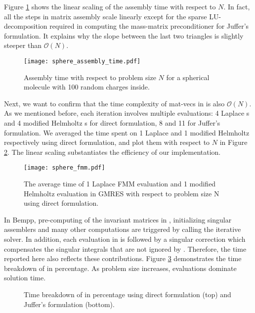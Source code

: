 Figure \ref{fig:sphere_assembly_time} shows the linear scaling of the assembly time with respect to $N$.
In fact, all the steps in matrix assembly scale linearly except for the sparse LU-decomposition required in computing the mass-matrix preconditioner for Juffer's formulation.
It explains why the slope between the last two triangles is slightly steeper than $\mathcal{O}(N)$.

\begin{figure}[htbp]
    \centering
    \texttt{[image: sphere\_assembly\_time.pdf]} 
    \caption{Assembly time with respect to problem size $N$ for a spherical molecule with 100 random charges inside.}
    \label{fig:sphere_assembly_time}
\end{figure}

Next, we want to confirm that the time complexity of mat-vecs in \gmres is also $\mathcal{O}(N)$.
As we mentioned before, each iteration involves multiple \fmm evaluations: 4 Laplace {\fmm}s and 4 modified Helmholtz {\fmm}s for direct formulation, 8 and 11 for Juffer's formulation.
We averaged the time spent on 1 Laplace \fmm and 1 modified Helmholtz \fmm respectively using direct formulation, and plot them with respect to $N$ in Figure \ref{fig:sphere_fmm}.
The linear scaling substantiates the efficiency of our \fmm implementation.

\begin{figure}[htbp]
    \centering
    \texttt{[image: sphere\_fmm.pdf]} 
    \caption{The average time of 1 Laplace FMM evaluation and 1 modified Helmholtz evaluation in GMRES with respect to problem size N using direct formulation.}
    \label{fig:sphere_fmm}
\end{figure}

In Bempp, pre-computing of the invariant matrices in \fmm, initializing singular assemblers and many other computations are triggered by calling the iterative solver.
In addition, each \fmm evaluation in \gmres is followed by a singular correction which compensates the singular integrals that are not ignored by \fmm.
Therefore, the \gmres time reported here also reflects these contributions.
Figure \ref{fig:sphere_gmres} demonstrates the time breakdown of \gmres in percentage.
As problem size increases, \fmm evaluations dominate solution time.

\begin{figure}[htbp]
    \begin{subfigure}{\columnwidth}
        \centering
    \end{subfigure}

    \begin{subfigure}{\columnwidth}
        \centering
    \end{subfigure}

    \caption{Time breakdown of \gmres in percentage using direct formulation (top) and Juffer's formulation (bottom).}
    \label{fig:sphere_gmres}
\end{figure}

